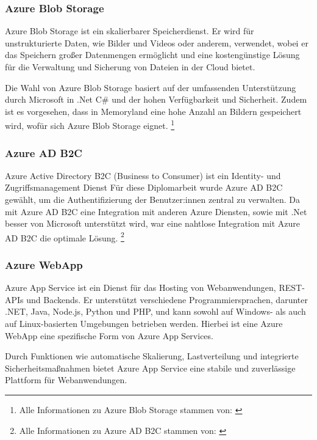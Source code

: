 \subsubsection{Azure Blob Storage}
\label{subsection:azure_blob_storage}

Azure Blob Storage ist ein skalierbarer Speicherdienst. Er wird für unstrukturierte Daten, 
wie Bilder und Videos oder anderem, verwendet, wobei er das Speichern großer Datenmengen 
ermöglicht und eine kostengünstige Lösung für die Verwaltung und Sicherung von Dateien 
in der Cloud bietet. 

Die Wahl von Azure Blob Storage basiert auf der umfassenden Unterstützung durch Microsoft 
in .Net C\# und der hohen Verfügbarkeit und Sicherheit. Zudem ist es vorgesehen, dass in Memoryland
eine hohe Anzahl an Bildern gespeichert wird, wofür sich Azure Blob Storage eignet.
\footnote{Alle Informationen zu Azure Blob Storage stammen von: \cite{MicrosoftCorporationu}}

\subsubsection{Azure AD B2C}
\label{subsection:azure_ad_b2c}

Azure Active Directory B2C (Business to Consumer) ist ein Identity- und Zugriffsmanagement Dienst
Für diese Diplomarbeit wurde Azure AD B2C gewählt, um die Authentifizierung der Benutzer:innen
zentral zu verwalten. Da mit Azure AD B2C eine Integration mit anderen Azure Diensten, sowie mit
.Net besser von Microsoft unterstützt wird, war eine nahtlose Integration mit Azure AD B2C 
die optimale Lösung.
\footnote{Alle Informationen zu Azure AD B2C stammen von: \cite{MicrosoftCorporationw} \cite{MicrosoftCorporationx}}

\subsubsection{Azure WebApp}
\label{subsection:azure_web_app}

Azure App Service ist ein Dienst für das Hosting von Webanwendungen, REST-APIs und 
Backends. Er unterstützt verschiedene Programmiersprachen, darunter .NET, Java, 
Node.js, Python und PHP, und kann sowohl auf Windows- als auch auf Linux-basierten 
Umgebungen betrieben werden. Hierbei ist eine Azure WebApp eine spezifische Form
von Azure App Services.

Durch Funktionen wie automatische Skalierung, Lastverteilung und integrierte 
Sicherheitsmaßnahmen bietet Azure App Service eine stabile und zuverlässige 
Plattform für Webanwendungen.

